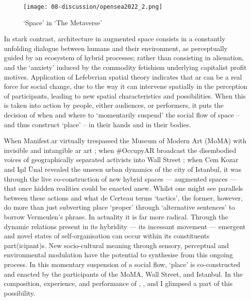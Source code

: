 \begin{figure}[ht]
    \centering
    \texttt{[image: 08-discussion/opensea2022\_2.png]}
    \captionsetup{justification=centering,margin=1.5cm}
    \caption{`Space' in `The Metaverse' \citep[from][]{opensea2022}}\label{fig: opensea2022_2}
\end{figure}

In stark contrast, architecture in augmented space consists in a constantly unfolding dialogue between humans and their environment, as perceptually guided by an ecosystem of hybrid processes; rather than consisting in alienation, and the `anxiety' induced by the commodity fetishism underlying capitalist profit motives. Application of Lefebvrian spatial theory indicates that \gls{ar} can be a real force for social change, due to the way it can intervene spatially in the perception of participants, leading to new spatial characteristics and possibilities. When this is taken into action by people, either audiences, or performers, it puts the decision of when and where to `momentarily suspend' the social flow of space -- and thus construct `place' -- in their hands and in their bodies.

When Manifest.\gls{ar} virtually trespassed the Museum of Modern Art (MoMA) with invisible and intangible \gls{ar} art \citep{veenhof2010}; when \#OccupyAR broadcast the disembodied voices of geographically separated activists into Wall Street \citep{skwarek2018}; when Cem Kozar and Işıl Ünal \citeyearpar{thiel2011,thiel2018} revealed the unseen urban dynamics of the city of Istanbul, it was through the live co-construction of new hybrid spaces — augmented spaces — that once hidden realities could be enacted anew. Whilst one might see parallels between these actions and what de Certeau terms `tactics', the former, however, do more than just subverting place `proper' through `alternative sentences' to borrow Vermeulen's phrase. In actuality it is far more radical. Through the dynamic relations present in its hybridity — its incessant movement — emergent and novel states of self-organisation can occur within its constituents part(icipant)s. New socio-cultural meaning through sensory, perceptual and environmental modulation have the potential to synthesise from this ongoing process. In this momentary suspension of a social flow, `place' is co-constructed and enacted by the participants of the MoMA, Wall Street, and Istanbul. In the composition, experience, and performance of \textit{}, \textit{}, and \textit{} I glimpsed a part of this possibility.



